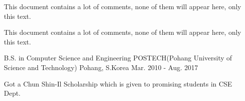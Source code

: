 \documentclass{awesome-cv}
\begin{document}
This document contains a lot of comments, none of them
will appear here, only this text.

This document contains a lot of comments, none of them
will appear here, only this text.



\begin{cventries}

  \cventry
    {B.S. in Computer Science and Engineering} %
    {POSTECH(Pohang University of Science and Technology)} %
    {Pohang, S.Korea} %
    {Mar. 2010 - Aug. 2017} %
    {
      \begin{cvitems} %
        \item {Got a Chun Shin-Il Scholarship which is given to promising students in CSE Dept.}
      \end{cvitems}
    }

\end{cventries}




\begin{comment}
This text won't show up in the compiled pdf
this is just a multi-line comment. Useful
to, for instance, comment out slow-rendering parts
while working on a draft.
\end{comment}
\end{document}
